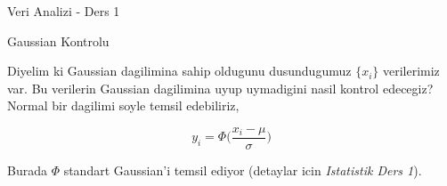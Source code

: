 \documentclass[12pt,fleqn]{article}\usepackage{../common}
\begin{document}
Veri Analizi - Ders 1

Gaussian Kontrolu

Diyelim ki Gaussian dagilimina sahip oldugunu dusundugumuz  $\{ x_i\}$
verilerimiz var. Bu verilerin Gaussian dagilimina uyup uymadigini nasil
kontrol edecegiz? Normal bir dagilimi soyle temsil edebiliriz, 

\[ y_i = \Phi\bigg(\frac{ x_i - \mu}{\sigma}\bigg) \]

Burada $\Phi$ standart Gaussian'i temsil ediyor (detaylar icin {\em Istatistik
Ders 1}). 
\end{document}
